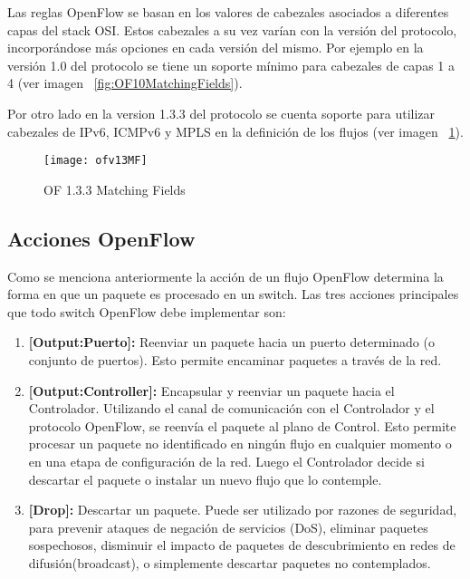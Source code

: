 Las reglas OpenFlow se basan en los valores de cabezales asociados a diferentes capas del stack OSI. Estos cabezales a su vez varían con la versi\'on del protocolo, incorporándose m\'as opciones en cada versi\'on del mismo. Por ejemplo en la versi\'on 1.0 del protocolo se tiene un soporte mínimo para cabezales de capas 1 a 4 (ver imagen ~\ref{fig:OF10MatchingFields}).

Por otro lado en la version 1.3.3 del protocolo se cuenta soporte para utilizar cabezales de IPv6, ICMPv6 y MPLS en la definición de los flujos (ver imagen ~\ref{fig:OF13MatchingFields}).
 
\begin{figure}[ht] 
\centering    
\texttt{[image: ofv13MF]}
\caption[OF 1.3.3 Matching Fields]{OF 1.3.3 Matching Fields}
\label{fig:OF13MatchingFields}
\end{figure}

\subsection{Acciones OpenFlow}

Como se menciona anteriormente la acci\'on de un flujo OpenFlow determina la forma en que un paquete es procesado en un switch. Las tres acciones principales que todo switch OpenFlow debe implementar son:

\begin{enumerate}
\item \textbf{[Output:Puerto]:} Reenviar un paquete hacia un puerto determinado (o conjunto de puertos). Esto permite encaminar paquetes a través de la red.

\item \textbf{[Output:Controller]:} Encapsular y reenviar un paquete hacia el Controlador. Utilizando el canal de comunicación con el Controlador y el protocolo OpenFlow, se reenvía el paquete al plano de Control. Esto permite procesar un paquete no identificado en ningún flujo en cualquier momento o en una etapa de configuración de la red. Luego el Controlador decide si descartar el paquete o instalar un nuevo flujo que lo contemple.

\item \textbf{[Drop]:} Descartar un paquete. Puede ser utilizado por razones de seguridad, para prevenir ataques de negación de servicios (DoS), eliminar paquetes sospechosos, disminuir el impacto de paquetes de descubrimiento en redes de difusión(broadcast), o simplemente descartar paquetes no contemplados.
\end{enumerate}

